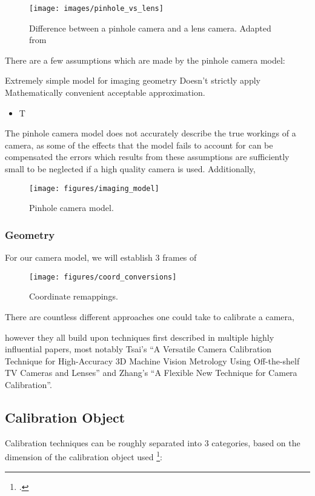 \begin{figure}[H]
    \centering
    \texttt{[image: images/pinhole\_vs\_lens]}
    \caption{Difference between a pinhole camera and a lens camera. Adapted from \cite{leCameraModel2018}}
\end{figure}



There are a few assumptions which are made by the pinhole camera model:

Extremely simple model for imaging geometry
Doesn't strictly apply
Mathematically convenient acceptable approximation.
\begin{itemize}
    \item T
\end{itemize}

The pinhole camera model does not accurately describe the true workings of a camera, as some of the  effects that the model fails to account for can be compensated the errors which results from these assumptions are sufficiently small to be neglected if a high quality camera is used. Additionally,

\begin{figure}[H]
    \centering
    \texttt{[image: figures/imaging\_model]}
    \caption{Pinhole camera model.}
\end{figure}

\subsubsection{Geometry}


For our camera model, we will establish 3 frames of


\begin{figure}[H]
    \centering
    \texttt{[image: figures/coord\_conversions]}
    \caption{Coordinate remappings.}
\end{figure}





There are countless different approaches one could take to calibrate a camera, 



however they all build upon techniques first described in multiple highly influential papers, most notably Tsai's ``A Versatile Camera Calibration Technique for High-Accuracy 3D Machine Vision Metrology Using Off-the-shelf TV Cameras and Lenses'' and Zhang's ``A Flexible New Technique for Camera Calibration''. 

\subsection{Calibration Object}

Calibration techniques can be roughly separated into 3 categories, based on the dimension of the calibration object used \footcite{zhangCameraCalibration2007}:


